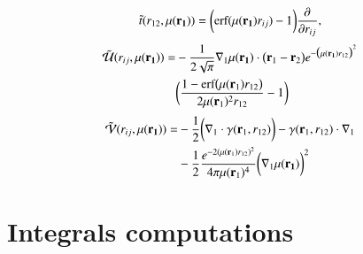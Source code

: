 \documentclass[aip,jcp,reprint,noshowkeys,superscriptaddress]{revtex4-1}
\newcommand{\deriv}[3]{\frac{\partial^{#3} #1}{\partial {#2}^{#3}}}
\newcommand{\br}[0]{{\bf {r}}}
\newcommand{\bri}[1]{{\bf r}_{#1}}
\newcommand{\mur}[1]{\mu({\bf r_{#1}})}
\begin{document}
\begin{equation}
 \begin{aligned}
 \tilde{t}(r_{12},\mur{1}) =  \bigg( \text{erf}(\mur{1} r_{ij}) - 1\bigg) \deriv{}{r_{ij}}{},
 \end{aligned}
\end{equation}
\begin{equation} 
\begin{aligned}
 \tilde{\mathcal{U}}(r_{ij},\mur{1}) = & -\frac{1}{2\sqrt{\pi}}\nabla_1 \mur{1} \cdot \big(\br_1 - \br_2 \big) 
  e^{-\big( \mur{1} r_{12}\big)^2}\\ & \bigg(\frac{1 - \text{erf}\big(\mu(\bri{1}) r_{12} \big)}{2 \mu(\bri{1})^2 r_{12}} -1\bigg)
 \end{aligned}
\end{equation}
\begin{equation}
 \begin{aligned}
 \tilde{\mathcal{V}}(r_{ij},\mur{1}) = & -\frac{1}{2}\bigg( \nabla_1 \cdot \gamma(\br_1, r_{12}) \bigg) - \gamma(\br_1, r_{12}) \cdot \nabla_1 
\\ 
&- \frac{1}{2}\frac{e^{-2(\mu(\bri{1}) r_{12})^2}}{4 \pi \mu(\bri{1})^4} \bigg( \nabla_1  \mur{1}\bigg)^2
 \end{aligned}
\end{equation}

\section{Integrals computations}
\end{document}
